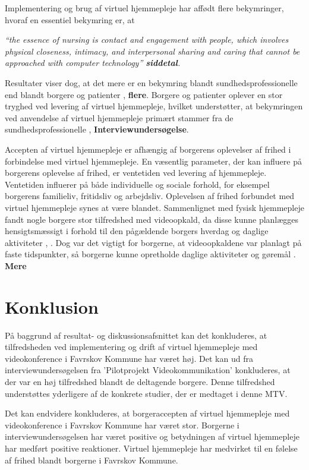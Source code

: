 {Implementering og brug af virtuel hjemmepleje har affødt flere bekymringer, hvoraf en essentiel bekymring er, at 

\begin{center}
\textit{“the essence of nursing is contact and engagement with people, which involves physical closeness, intimacy, and interpersonal sharing and caring that cannot be approached with computer technology” \cite{telenursing} \textbf{siddetal}.}
\end{center}

Resultater viser dog, at det mere er en bekymring blandt sundhedsprofessionelle end blandt borgere og patienter \cite{telenursing}, \textbf{flere}. Borgere og patienter oplever en stor tryghed ved levering af virtuel hjemmepleje, hvilket understøtter, at bekymringen ved anvendelse af virtuel hjemmepleje primært stammer fra de sundhedsprofessionelle \cite{Baf2}, \textbf{Interviewundersøgelse}. 

Accepten af virtuel hjemmepleje er afhængig af borgerens oplevelser af frihed i forbindelse med virtuel hjemmepleje. En væsentlig parameter, der kan influere på borgerens oplevelse af frihed, er ventetiden ved levering af hjemmepleje. Ventetiden influerer på både individuelle og sociale forhold, for eksempel borgerens familieliv, fritidsliv og arbejdsliv. Oplevelsen af frihed forbundet med virtuel hjemmepleje synes at være blandet. Sammenlignet med fysisk hjemmepleje fandt nogle borgere stor tilfredshed med videoopkald, da disse kunne planlægges hensigtsmæssigt i forhold til den pågældende borgers hverdag og daglige aktiviteter \cite{kandidat}, \cite{wade}. Dog var det vigtigt for borgerne, at videoopkaldene var planlagt på faste tidspunkter, så borgerne kunne opretholde daglige aktiviteter og gøremål \cite{kandidat}. \textbf{Mere}

\section{Konklusion}
På baggrund af resultat- og diskussionsafsnittet kan det konkluderes, at tilfredsheden ved implementering og drift af virtuel hjemmepleje med videokonference i Favrskov Kommune har været høj. Det kan ud fra interviewundersøgelsen fra ’Pilotprojekt Videokommunikation’ konkluderes, at der var en høj tilfredshed blandt de deltagende borgere. Denne tilfredshed understøttes yderligere af de konkrete studier, der er medtaget i denne MTV.

Det kan endvidere konkluderes, at borgeraccepten af virtuel hjemmepleje med videokonference i Favrskov Kommune har været stor. Borgerne i interviewundersøgelsen har været positive og betydningen af virtuel hjemmepleje har medført positive reaktioner. Virtuel hjemmepleje har medvirket til en følelse af frihed blandt borgerne i Favrskov Kommune.

}
